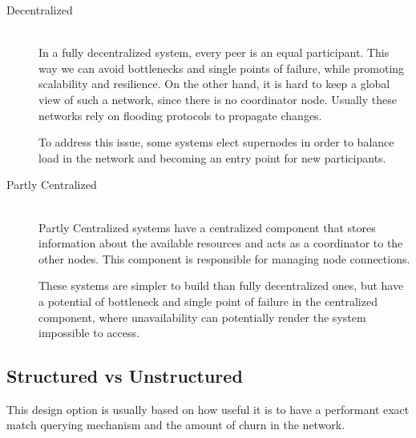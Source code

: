 \begin{description}
\item[Decentralized] \hfill \\
In a fully decentralized system, every peer is an equal participant. This way we can avoid bottlenecks and single points of failure, while promoting scalability and resilience. On the other hand, it is hard to keep a global view of such a network, since there is no coordinator node. Usually these networks rely on flooding protocols to propagate changes.\par
	To address this issue, some systems elect supernodes in order to balance load in the network and becoming an entry point for new participants.

\item[Partly Centralized] \hfill \\
Partly Centralized systems have a centralized component that stores information about the available resources and acts as a coordinator to the other nodes. This component is responsible for managing node connections.\par
	These systems are simpler to build than fully decentralized ones, but have a potential of bottleneck and single point of failure in the centralized component, where unavailability can potentially render the system impossible to access.

\end{description}

\subsection{Structured vs Unstructured}
This design option is usually based on how useful it is to have a performant exact match querying mechanism and the amount of churn in the network.

